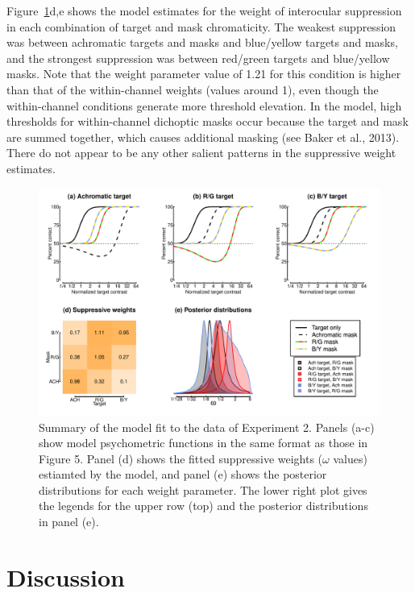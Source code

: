 \documentclass[
  letterpaper,
  DIV=11,
  numbers=noendperiod]{scrartcl}
\begin{document}
Figure~\ref{fig-MCSmodel}d,e shows the model estimates for the weight of
interocular suppression in each combination of target and mask
chromaticity. The weakest suppression was between achromatic targets and
masks and blue/yellow targets and masks, and the strongest suppression
was between red/green targets and blue/yellow masks. Note that the
weight parameter value of 1.21 for this condition is higher than that of
the within-channel weights (values around 1), even though the
within-channel conditions generate more threshold elevation. In the
model, high thresholds for within-channel dichoptic masks occur because
the target and mask are summed together, which causes additional masking
(see Baker et al., 2013). There do not appear to be any other salient
patterns in the suppressive weight estimates.

\begin{figure}

{\centering \includegraphics{Figures/MCSmodel.pdf}

}

\caption{\label{fig-MCSmodel}Summary of the model fit to the data of
Experiment 2. Panels (a-c) show model psychometric functions in the same
format as those in Figure 5. Panel (d) shows the fitted suppressive
weights (\(\omega\) values) estiamted by the model, and panel (e) shows
the posterior distributions for each weight parameter. The lower right
plot gives the legends for the upper row (top) and the posterior
distributions in panel (e).}

\end{figure}

\hypertarget{discussion}{%
\section{Discussion}\label{discussion}}
\end{document}
